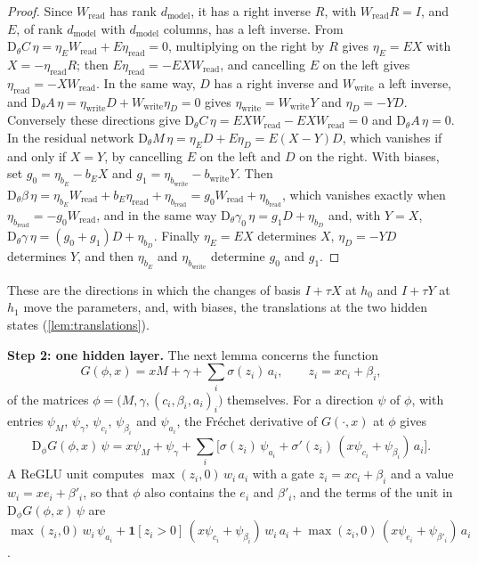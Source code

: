 \documentclass[10pt]{article}
\theoremstyle{definition}
\theoremstyle{remark}
\newcommand{\Wread}{W_{\mathrm{read}}}
\newcommand{\Wwrite}{W_{\mathrm{write}}}
\newcommand{\dm}{d_{\mathrm{model}}}
\newcommand{\Der}{\mathrm{D}}
\newcommand{\para}[1]{\smallskip\noindent\textbf{#1}\hspace{0.5em}}
\begin{document}
\begin{proof}
Since $\Wread$ has rank $\dm$, it has a right inverse $R$, with $\Wread R = I$, and $E$, of rank $\dm$ with $\dm$ columns, has a left inverse. From $\Der_\theta C\,\eta = \eta_E\Wread + E\eta_{\mathrm{read}} = 0$, multiplying on the right by $R$ gives $\eta_E = EX$ with $X = -\eta_{\mathrm{read}}R$; then $E\eta_{\mathrm{read}} = -EX\Wread$, and cancelling $E$ on the left gives $\eta_{\mathrm{read}} = -X\Wread$. In the same way, $D$ has a right inverse and $\Wwrite$ a left inverse, and $\Der_\theta A\,\eta = \eta_{\mathrm{write}}D + \Wwrite\eta_D = 0$ gives $\eta_{\mathrm{write}} = \Wwrite Y$ and $\eta_D = -YD$. Conversely these directions give $\Der_\theta C\,\eta = EX\Wread - EX\Wread = 0$ and $\Der_\theta A\,\eta = 0$. In the residual network $\Der_\theta M\,\eta = \eta_ED + E\eta_D = E(X - Y)D$, which vanishes if and only if $X = Y$, by cancelling $E$ on the left and $D$ on the right. With biases, set $g_0 = \eta_{b_E} - b_EX$ and $g_1 = \eta_{b_{\mathrm{write}}} - b_{\mathrm{write}}Y$. Then $\Der_\theta\beta\,\eta = \eta_{b_E}\Wread + b_E\eta_{\mathrm{read}} + \eta_{b_{\mathrm{read}}} = g_0\Wread + \eta_{b_{\mathrm{read}}}$, which vanishes exactly when $\eta_{b_{\mathrm{read}}} = -g_0\Wread$, and in the same way $\Der_\theta\gamma_0\,\eta = g_1D + \eta_{b_D}$ and, with $Y = X$, $\Der_\theta\gamma\,\eta = (g_0 + g_1)D + \eta_{b_D}$. Finally $\eta_E = EX$ determines $X$, $\eta_D = -YD$ determines $Y$, and then $\eta_{b_E}$ and $\eta_{b_{\mathrm{write}}}$ determine $g_0$ and $g_1$.
\end{proof}

These are the directions in which the changes of basis $I + \tau X$ at $h_0$ and $I + \tau Y$ at $h_1$ move the parameters, and, with biases, the translations at the two hidden states (\cref{lem:translations}).

\para{Step 2: one hidden layer.} The next lemma concerns the function
\[
G(\phi, x) = xM + \gamma + \textstyle\sum_i \sigma(z_i)\,a_i,\qquad z_i = xc_i + \beta_i,
\]
of the matrices $\phi = \big(M, \gamma, (c_i, \beta_i, a_i)_i\big)$ themselves. For a direction $\psi$ of $\phi$, with entries $\psi_M$, $\psi_\gamma$, $\psi_{c_i}$, $\psi_{\beta_i}$ and $\psi_{a_i}$, the Fr\'echet derivative of $G(\cdot, x)$ at $\phi$ gives
\begin{equation}\label{eq:dotF}
\Der_\phi G(\phi, x)\,\psi = x\psi_M + \psi_\gamma + \sum_i \big[\sigma(z_i)\,\psi_{a_i} + \sigma'(z_i)\,(x\psi_{c_i} + \psi_{\beta_i})\,a_i\big].
\end{equation}
A ReGLU unit computes $\max(z_i, 0)\,w_i\,a_i$ with a gate $z_i = xc_i + \beta_i$ and a value $w_i = xe_i + \beta'_i$, so that $\phi$ also contains the $e_i$ and $\beta'_i$, and the terms of the unit in $\Der_\phi G(\phi, x)\,\psi$ are $\max(z_i, 0)\,w_i\,\psi_{a_i} + \mathbf 1[z_i > 0]\,(x\psi_{c_i} + \psi_{\beta_i})\,w_i\,a_i + \max(z_i, 0)\,(x\psi_{e_i} + \psi_{\beta'_i})\,a_i$.
\end{document}
